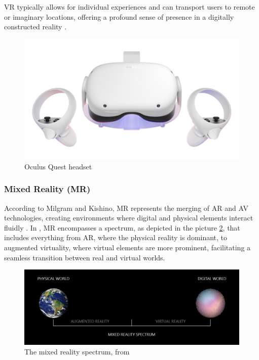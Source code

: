     \ac{VR} typically allows for individual experiences and can transport users to remote or imaginary locations, offering a profound sense 
    of presence in a digitally constructed reality \cite{whatismixedreality, 8712803}.
    
    \begin{figure}[h]
        \centering
        \includegraphics[width=0.6\linewidth]{figs/oculus-2-vr.png}
        \caption{Oculus Quest headset}
        \label{f:quest-2-vr}
    \end{figure}

\subsubsection{Mixed Reality (\ac{MR})}

    According to Milgram and Kishino, \ac{MR} represents the merging of \ac{AR} and \ac{AV} technologies, creating environments where digital and physical elements interact fluidly \cite{milgram1994}. 
    In \cite{microsoft_mixed_reality}, \ac{MR} encompasses a spectrum, as depicted in the picture \ref{f:mixed-spectrum}, that includes everything
    from \ac{AR}, where the physical reality is dominant, to augmented virtuality, where virtual elements are more prominent, facilitating a seamless
    transition between real and virtual worlds.

    \begin{figure}[!htpb]
        \centering
        \includegraphics[width=0.8\linewidth]{figs/mixed-reality-spectrum.jpeg}
        \caption{The mixed reality spectrum, from \cite{microsoft_mixed_reality}}
        \label{f:mixed-spectrum}
    \end{figure}
    
